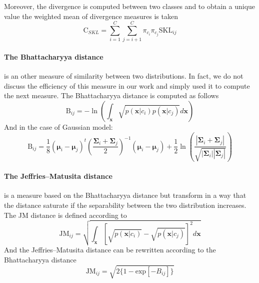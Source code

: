 \documentclass[a4paper,11pt,DIV=16]{scrartcl}
\begin{document}
        Moreover, the divergence is computed between two classes and to obtain a unique value the weighted mean of divergence measures is taken
        \begin{equation}
            \text{C}_{SKL} = \sum_{i=1}^{C} \sum_{j=i + 1}^{C} \pi_{c_i} \pi_{c_j} \text{SKL}_{ij}
        \end{equation}

        \paragraph{The Bhattacharyya distance} is an other measure of similarity between two distributions. In fact, we do not discuss the efficiency of this measure in our work and simply used it to compute the next measure. The Bhattacharyya distance is computed as follows
        \begin{equation}
            \text{B}_{ij} = - \ln \left( \int_\mathbf{x} \sqrt{p(\mathbf{x}|c_i) p(\mathbf{x}|c_j)} d\mathbf{x} \right)
        \end{equation}
        And in the case of Gaussian model:
        \begin{equation}
            \text{B}_{ij} = \frac{1}{8} (\boldsymbol{\mu}_i - \boldsymbol{\mu}_j)^t \left( \frac{\boldsymbol{\Sigma}_i + \boldsymbol{\Sigma}_j}{2} \right)^{-1} (\boldsymbol{\mu}_i - \boldsymbol{\mu}_j) + \frac{1}{2} \ln \left( \frac{|\boldsymbol{\Sigma}_i + \boldsymbol{\Sigma}_j|}{\sqrt{|\boldsymbol{\Sigma}_i| |\boldsymbol{\Sigma}_j|}} \right)
        \end{equation}

        \paragraph{The Jeffries–Matusita distance} is a measure based on the Bhattacharyya distance but transform in a way that the distance saturate if the separability between the two distribution increases. The JM distance is defined according to
        \begin{equation}
            \text{JM}_{ij} = \sqrt{ \int_\mathbf{x} \left[\sqrt{p(\mathbf{x}|c_i)} - \sqrt{p(\mathbf{x}|c_j)}\right]^2 d\mathbf{x} }
        \end{equation}
        And the Jeffries–Matusita distance can be rewritten according to the Bhattacharyya distance
        \begin{equation}
            \text{JM}_{ij} = \sqrt{ 2 \{1 - \text{exp}[-B_{ij}]\} }
        \end{equation}
\end{document}
